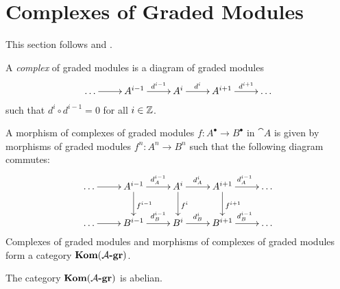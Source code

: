 \section{Complexes of Graded Modules}

This section follows \cite{huybrechts} and \cite{weibel}.

\begin{definition}
    A \textit{complex} of graded modules is a diagram of graded modules
    \[
        \xymatrix{
            \dots \ar[r] & A^{i-1} \ar[r]^-{d^{i-1}} & A^i \ar[r]^-{d^i} & A^{i+1} \ar[r]^-{d^{i+1}} & \dots
        }
    \]
    such that $d^i \circ d^{i-1} = 0$ for all $i \in {\mathbb Z}$.

    A morphism of complexes of graded modules $f: A^\bullet \rightarrow B^\bullet$ in $\cat{A}$ is given by morphisms of graded modules $f^n: A^n \rightarrow B^n$ such that the following diagram commutes:
    \[
        \xymatrix{
            \dots \ar[r] & A^{i-1} \ar[r]^-{d^{i-1}_A} \ar[d]^{f^{i-1}} & A^i \ar[r]^-{d^i_A} \ar[d]^{f^i} & A^{i+1} \ar[r]^{d^{i-1}_A} \ar[d]^{f^{i+1}} & \dots \\
            \dots \ar[r] & B^{i-1} \ar[r]^-{d^{i-1}_B} & B^i \ar[r]^-{d^i_B} & B^{i+1} \ar[r]^{d^{i-1}_B} & \dots
        }
    \]
    Complexes of graded modules and morphisms of complexes of graded modules form a category $\textrm{\textup{\textbf{Kom}}}(\mathcal{A\textrm{\textup{\textbf{-gr}}}})$.
\end{definition}

\begin{proposition}
    The category $\textrm{\textup{\textbf{Kom}}}(\mathcal{A\textrm{\textup{\textbf{-gr}}}})$ is abelian.
\end{proposition}


